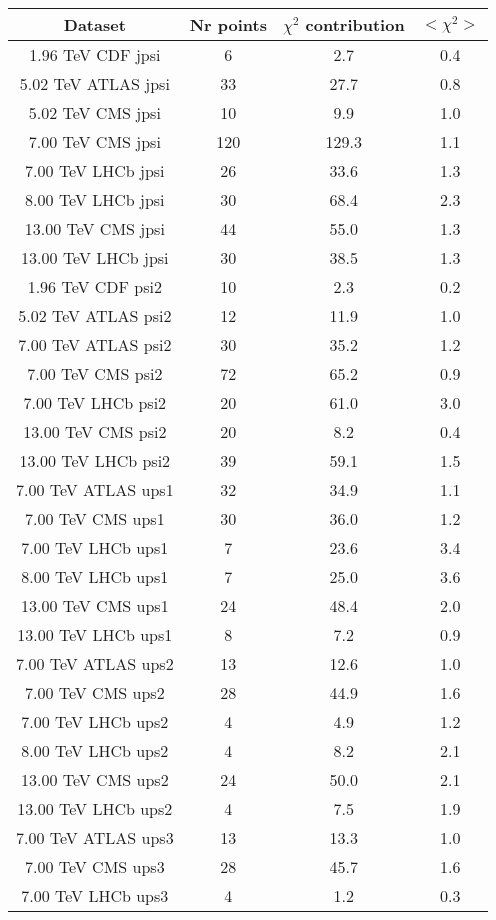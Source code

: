 \begin{table}[h!]
\centering
\begin{tabular}{c|c|c|c}
Dataset & Nr points & $\chi^2$ contribution & $<\chi^2>$ \\
\hline
1.96 TeV CDF jpsi & 6 & 2.7 & 0.4 \\
5.02 TeV ATLAS jpsi & 33 & 27.7 & 0.8 \\
5.02 TeV CMS jpsi & 10 & 9.9 & 1.0 \\
7.00 TeV CMS jpsi & 120 & 129.3 & 1.1 \\
7.00 TeV LHCb jpsi & 26 & 33.6 & 1.3 \\
8.00 TeV LHCb jpsi & 30 & 68.4 & 2.3 \\
13.00 TeV CMS jpsi & 44 & 55.0 & 1.3 \\
13.00 TeV LHCb jpsi & 30 & 38.5 & 1.3 \\
1.96 TeV CDF psi2 & 10 & 2.3 & 0.2 \\
5.02 TeV ATLAS psi2 & 12 & 11.9 & 1.0 \\
7.00 TeV ATLAS psi2 & 30 & 35.2 & 1.2 \\
7.00 TeV CMS psi2 & 72 & 65.2 & 0.9 \\
7.00 TeV LHCb psi2 & 20 & 61.0 & 3.0 \\
13.00 TeV CMS psi2 & 20 & 8.2 & 0.4 \\
13.00 TeV LHCb psi2 & 39 & 59.1 & 1.5 \\
7.00 TeV ATLAS ups1 & 32 & 34.9 & 1.1 \\
7.00 TeV CMS ups1 & 30 & 36.0 & 1.2 \\
7.00 TeV LHCb ups1 & 7 & 23.6 & 3.4 \\
8.00 TeV LHCb ups1 & 7 & 25.0 & 3.6 \\
13.00 TeV CMS ups1 & 24 & 48.4 & 2.0 \\
13.00 TeV LHCb ups1 & 8 & 7.2 & 0.9 \\
7.00 TeV ATLAS ups2 & 13 & 12.6 & 1.0 \\
7.00 TeV CMS ups2 & 28 & 44.9 & 1.6 \\
7.00 TeV LHCb ups2 & 4 & 4.9 & 1.2 \\
8.00 TeV LHCb ups2 & 4 & 8.2 & 2.1 \\
13.00 TeV CMS ups2 & 24 & 50.0 & 2.1 \\
13.00 TeV LHCb ups2 & 4 & 7.5 & 1.9 \\
7.00 TeV ATLAS ups3 & 13 & 13.3 & 1.0 \\
7.00 TeV CMS ups3 & 28 & 45.7 & 1.6 \\
7.00 TeV LHCb ups3 & 4 & 1.2 & 0.3 \\

\end{tabular}
\end{table}
